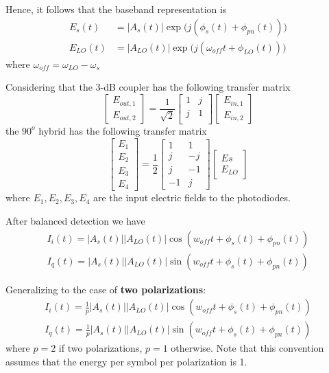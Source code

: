 \documentclass[a4paper]{article}
\begin{document}
Hence, it follows that the baseband representation is 
\begin{align}
E_s(t) &= |A_s(t)|\exp\Big(j(\phi_s(t) + \phi_{pn}(t))\Big) \\
E_{LO}(t) &= |A_{LO}(t)|\exp\Big(j(\omega_{off}t + \phi_{LO}(t))\Big)
\end{align}
where $\omega_{off} =\omega_{LO}-\omega_s$

Considering that the 3-dB coupler has the following transfer matrix
\begin{equation}
\begin{bmatrix}
E_{out, 1} \\
E_{out, 2}
\end{bmatrix} = \frac{1}{\sqrt{2}}\begin{bmatrix}
1 & j \\
j & 1 \\
\end{bmatrix}\begin{bmatrix}
E_{in, 1} \\
E_{in, 2}
\end{bmatrix}
\end{equation}
the $90^o$ hybrid has the following transfer matrix
\begin{equation}
\begin{bmatrix}
E_1\\
E_2\\
E_3\\
E_4
\end{bmatrix} = \frac{1}{2}\begin{bmatrix}
1 & 1 \\
j & -j \\
j & -1\\
-1 & j
\end{bmatrix}\begin{bmatrix}
E{s} \\
E_{LO}
\end{bmatrix}
\end{equation}
where $E_1, E_2, E_3, E_4$ are the input electric fields to the photodiodes.

After balanced detection we have
\begin{align}
I_i(t) = |A_s(t)||A_{LO}(t)|\cos(w_{off}t + \phi_s(t) + \phi_{pn}(t)) \\
I_q(t) = |A_s(t)||A_{LO}(t)|\sin(w_{off}t + \phi_s(t) + \phi_{pn}(t))
\end{align}

Generalizing to the case of \textbf{two polarizations}:
\begin{align}
I_i(t) = \frac{1}{p}|A_s(t)||A_{LO}(t)|\cos(w_{off}t + \phi_s(t) + \phi_{pn}(t)) \\
I_q(t) = \frac{1}{p}|A_s(t)||A_{LO}(t)|\sin(w_{off}t + \phi_s(t) + \phi_{pn}(t))
\end{align}
where $p = 2$ if two polarizations, $p = 1$ otherwise. Note that this convention assumes that the energy per symbol per polarization is 1.  
\end{document}
